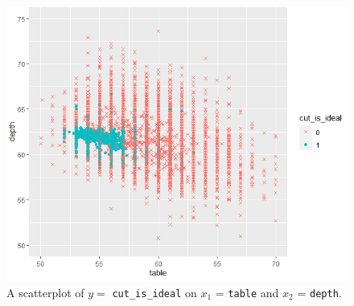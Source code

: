 \documentclass[12pt]{article}
\begin{document}
\pagebreak


\begin{figure}[htp]
\centering
\includegraphics[width=7in]{cut_is_ideal.png}
\caption{A scatterplot of $y = $ \texttt{cut\_is\_ideal} on $x_1$ = \texttt{table} and $x_2$ = \texttt{depth}.}
\end{figure}
\end{document}
